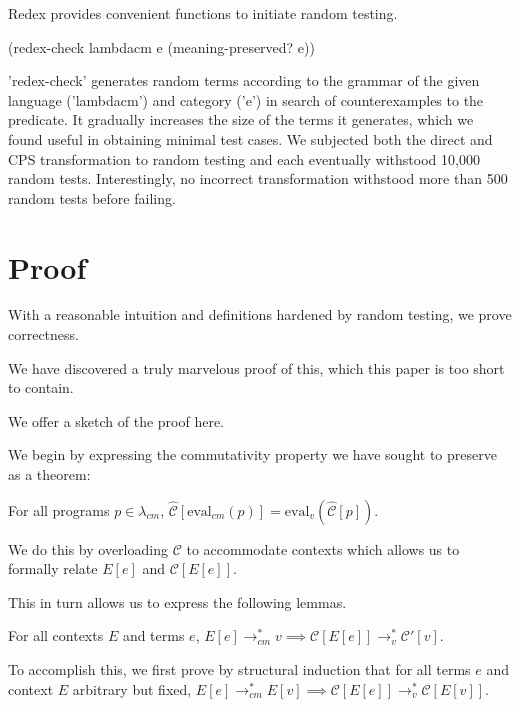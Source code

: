 \documentclass{llncs}
\newcommand{\lvrrs}[0]{\rightarrow_v^{*}}
\newcommand{\cmrrs}[0]{\rightarrow_{cm}^{*}}
\newcommand{\C}[1]{\mathcal{C}[#1]}
\newcommand{\Cp}[1]{\mathcal{C}'[#1]}
\newcommand{\Ch}[1]{\hat{\mathcal{C}}[#1]}
\begin{document}
Redex provides convenient functions to initiate random testing.

\begin{schemedisplay}
(redex-check lambdacm e (meaning-preserved? e))
\end{schemedisplay}

\scheme'redex-check' generates random terms according to the grammar of the given language (\scheme'lambdacm') and category (\scheme'e') in search of counterexamples to the predicate. It gradually increases the size of the terms it generates, which we found useful in obtaining minimal test cases. We subjected both the direct and CPS transformation to random testing and each eventually withstood 10,000 random tests. Interestingly, no incorrect transformation withstood more than 500 random tests before failing.

\section{Proof}
\label{sec-proof}

With a reasonable intuition and definitions hardened by random testing, we prove correctness.

We have discovered a truly marvelous proof of this, which this paper is too short to contain.

We offer a sketch of the proof here.

We begin by expressing the commutativity property we have sought to preserve as a theorem:

\begin{theorem}
For all programs $p\in\lambda_{cm}$, $\Ch{\mathrm{eval}_{cm}(p)}=\mathrm{eval}_{v}(\Ch{p})$.
\end{theorem}

We do this by overloading $\mathcal{C}$ to accommodate contexts which allows us to formally relate $E[e]$ and $\C{E[e]}$.

This in turn allows us to express the following lemmas.

\begin{lemma}
For all contexts $E$ and terms $e$, $E[e]\cmrrs v\implies\C{E[e]}\lvrrs\Cp{v}$.
\end{lemma}

To accomplish this, we first prove by structural induction that for all terms $e$ and context $E$ arbitrary but fixed, $E[e]\cmrrs E[v]\implies\C{E[e]}\lvrrs\C{E[v]}$. 
\end{document}
